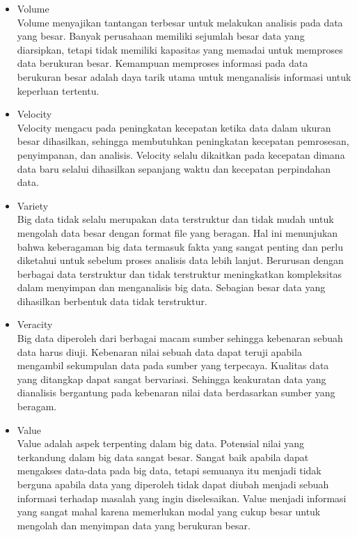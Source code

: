 \begin{itemize}
\item Volume\\
Volume menyajikan tantangan terbesar untuk melakukan analisis pada data yang besar. Banyak perusahaan memiliki sejumlah besar data yang diarsipkan, tetapi tidak memiliki kapasitas yang memadai untuk memproses data berukuran besar. Kemampuan memproses informasi pada data berukuran besar adalah daya tarik utama untuk menganalisis informasi untuk keperluan tertentu.
\item Velocity\\
Velocity mengacu pada peningkatan kecepatan ketika data dalam ukuran besar dihasilkan, sehingga membutuhkan peningkatan kecepatan pemrosesan, penyimpanan, dan analisis. Velocity selalu dikaitkan pada kecepatan dimana data baru selalui dihasilkan sepanjang waktu dan kecepatan perpindahan data.
\item Variety\\
Big data tidak selalu merupakan data terstruktur dan tidak mudah untuk mengolah data besar dengan format file yang beragan. Hal ini menunjukan bahwa keberagaman big data termasuk fakta yang sangat penting dan perlu diketahui untuk sebelum proses analisis data lebih lanjut. Berurusan dengan berbagai data terstruktur dan tidak terstruktur meningkatkan kompleksitas dalam menyimpan dan menganalisis big data. Sebagian besar data yang dihasilkan berbentuk data tidak terstruktur.
\item Veracity\\
Big data diperoleh dari berbagai macam sumber sehingga kebenaran sebuah data harus diuji. Kebenaran nilai sebuah data dapat teruji apabila mengambil sekumpulan data pada sumber yang terpecaya. Kualitas data yang ditangkap dapat sangat bervariasi. Sehingga keakuratan data yang dianalisis bergantung pada kebenaran nilai data berdasarkan sumber yang beragam.
\item Value\\
Value adalah aspek terpenting dalam big data. Potensial nilai yang terkandung dalam big data sangat besar. Sangat baik apabila dapat mengakses data-data pada big data, tetapi semuanya itu menjadi tidak berguna apabila data yang diperoleh tidak dapat diubah menjadi sebuah informasi terhadap masalah yang ingin diselesaikan. Value menjadi informasi yang sangat mahal karena memerlukan modal yang cukup besar untuk mengolah dan menyimpan data yang berukuran besar.
\end{itemize}

\newpage

